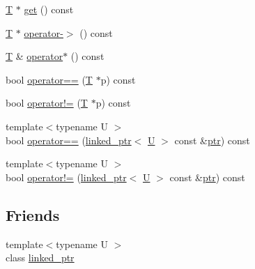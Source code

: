 \begin{DoxyCompactItemize}
\item 
\hyperlink{calib3d_8hpp_a3efb9551a871ddd0463079a808916717}{T} $\ast$ \hyperlink{classtesting_1_1internal_1_1linked__ptr_a6ea8584d9bcad13c3266834f5ce5e771}{get} () const 
\item 
\hyperlink{calib3d_8hpp_a3efb9551a871ddd0463079a808916717}{T} $\ast$ \hyperlink{classtesting_1_1internal_1_1linked__ptr_aa878c3e874242fb3cd2aa14ec603aa25}{operator-\/$>$} () const 
\item 
\hyperlink{calib3d_8hpp_a3efb9551a871ddd0463079a808916717}{T} \& \hyperlink{classtesting_1_1internal_1_1linked__ptr_aec393cbd60f96defde36ef8a69d94254}{operator$\ast$} () const 
\item 
bool \hyperlink{classtesting_1_1internal_1_1linked__ptr_abe2154fd3ad3574dfe6f2320bc1debc4}{operator==} (\hyperlink{calib3d_8hpp_a3efb9551a871ddd0463079a808916717}{T} $\ast$p) const 
\item 
bool \hyperlink{classtesting_1_1internal_1_1linked__ptr_a3685f9661bbe410cfa58fea2f14396b7}{operator!=} (\hyperlink{calib3d_8hpp_a3efb9551a871ddd0463079a808916717}{T} $\ast$p) const 
\item 
{\footnotesize template$<$typename U $>$ }\\bool \hyperlink{classtesting_1_1internal_1_1linked__ptr_a3b46c9ecfd928673a524dcb3c70fd2ad}{operator==} (\hyperlink{classtesting_1_1internal_1_1linked__ptr}{linked\-\_\-ptr}$<$ \hyperlink{core__c_8h_aa9c521f41af9a5191e5e4b6ffbae211a}{U} $>$ const \&\hyperlink{core__c_8h_a166529da793cc1ef241cff347f3db5a5}{ptr}) const 
\item 
{\footnotesize template$<$typename U $>$ }\\bool \hyperlink{classtesting_1_1internal_1_1linked__ptr_a6449584b90a09a313300599fb3a23633}{operator!=} (\hyperlink{classtesting_1_1internal_1_1linked__ptr}{linked\-\_\-ptr}$<$ \hyperlink{core__c_8h_aa9c521f41af9a5191e5e4b6ffbae211a}{U} $>$ const \&\hyperlink{core__c_8h_a166529da793cc1ef241cff347f3db5a5}{ptr}) const 
\end{DoxyCompactItemize}
\subsection*{Friends}
\begin{DoxyCompactItemize}
\item 
{\footnotesize template$<$typename U $>$ }\\class \hyperlink{classtesting_1_1internal_1_1linked__ptr_a7763f286ca03a7f7363a033d996c8c1c}{linked\-\_\-ptr}
\end{DoxyCompactItemize}


